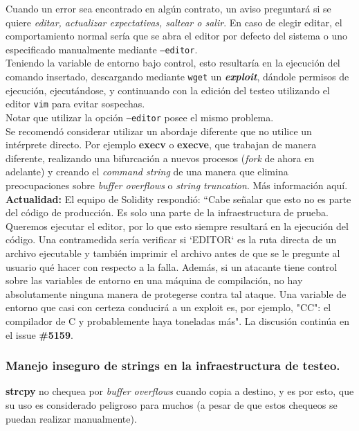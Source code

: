 Cuando un error sea encontrado en algún contrato, un aviso preguntará si se quiere \textit{editar, actualizar expectativas, saltear o salir}. En caso de elegir editar, el comportamiento normal sería que se abra el editor por defecto del sistema o uno especificado manualmente mediante \texttt{--editor}.\\

Teniendo la variable de entorno bajo control, esto resultaría en la ejecución del comando insertado, descargando mediante \texttt{wget} un \textit{\textbf{exploit}}, dándole permisos de ejecución, ejecutándose, y continuando con la edición del testeo utilizando el editor \texttt{vim} para evitar sospechas.\\

Notar que utilizar la opción \texttt{--editor} posee el mismo problema.\\

Se recomendó considerar utilizar un abordaje diferente que no utilice un intérprete directo. Por ejemplo \textbf{execv} o \textbf{execve}, que trabajan de manera diferente, realizando una bifurcación a nuevos procesos (\textit{fork} de ahora en adelante) y creando el \textit{command string} de una manera que elimina preocupaciones sobre \textit{buffer overflows} o \textit{string truncation}. Más información aquí\cite{CMUSystem}.\\

\textbf{Actualidad:} El equipo de Solidity respondió: “Cabe señalar que esto no es parte del código de producción. Es solo una parte de la infraestructura de prueba. Queremos ejecutar el editor, por lo que esto siempre resultará en la ejecución del código. Una contramedida sería verificar si `EDITOR` es la ruta directa de un archivo ejecutable y también imprimir el archivo antes de que se le pregunte al usuario qué hacer con respecto a la falla. Además, si un atacante tiene control sobre las variables de entorno en una máquina de compilación, no hay absolutamente ninguna manera de protegerse contra tal ataque. Una variable de entorno que casi con certeza conducirá a un exploit es, por ejemplo, "CC": el compilador de C y probablemente haya toneladas más". La discusión continúa en el issue \textbf{\#5159}\cite{GHI5159}.\\

\subsubsection{Manejo inseguro de strings en la infraestructura de testeo.}
\textbf{strcpy} no chequea por \textit{buffer overflows} cuando copia a destino, y es por esto, que su uso es considerado peligroso para muchos\cite{MSSDLBanned} (a pesar de que estos chequeos se puedan realizar manualmente).


